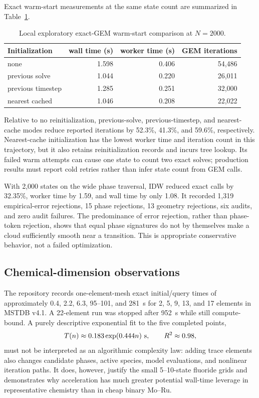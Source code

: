 \documentclass[11pt]{article}
\begin{document}
Exact warm-start measurements at the same state count are summarized in
Table~\ref{tab:warm-start}.
\begin{table}[H]
  \centering
  \caption{Local exploratory exact-GEM warm-start comparison at \(N=2000\).}
  \label{tab:warm-start}
  \begin{tabular}{lrrr}
    \toprule
    Initialization & wall time (s) & worker time (s) & GEM iterations \\
    \midrule
    none & 1.598 & 0.406 & 54,486 \\
    previous solve & 1.044 & 0.220 & 26,011 \\
    previous timestep & 1.285 & 0.251 & 32,000 \\
    nearest cached & 1.046 & 0.208 & 22,022 \\
    \bottomrule
  \end{tabular}
\end{table}
Relative to no reinitialization, previous-solve, previous-timestep, and nearest-cache modes reduce
reported iterations by 52.3\%, 41.3\%, and 59.6\%, respectively.  Nearest-cache initialization has
the lowest worker time and iteration count in this trajectory, but it also retains reinitialization
records and incurs tree lookup.  Its failed warm attempts can cause one state to count two exact
solves; production results must report cold retries rather than infer state count from GEM calls.

With 2,000 states on the wide phase traversal, IDW reduced exact calls by 32.35\%, worker time by
1.59, and wall time by only 1.08.  It recorded 1,319 empirical-error rejections, 15 phase
rejections, 13 geometry rejections, six audits, and zero audit failures.  The predominance of
error rejection, rather than phase-token rejection, shows that equal phase signatures do not by
themselves make a cloud sufficiently smooth near a transition.  This is appropriate conservative
behavior, not a failed optimization.

\subsection{Chemical-dimension observations}

The repository records one-element-mesh exact initial/query times of approximately 0.4, 2.2, 6.3,
95--101, and 281~s for 2, 5, 9, 13, and 17 elements in MSTDB v4.1.  A 22-element run was stopped
after 952~s while still compute-bound.  A purely descriptive exponential fit to the five completed
points,
\begin{equation}
  T(n)\approx0.183\exp(0.444n)\ {\rm s},
  \qquad R^2\approx0.98,
\end{equation}
must not be interpreted as an algorithmic complexity law: adding trace elements also changes
candidate phases, active species, model evaluations, and nonlinear iteration paths.  It does,
however, justify the small 5--10-state fluoride grids and demonstrates why acceleration has much
greater potential wall-time leverage in representative chemistry than in cheap binary Mo--Ru.
\end{document}
